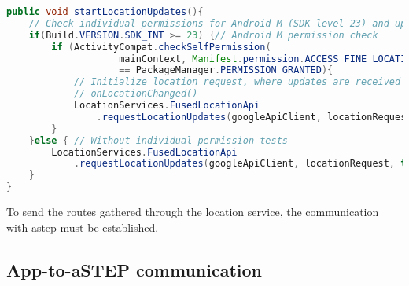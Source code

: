 \begin{lstlisting}[language=Java, label=startLocationUpdates, caption=Start location updates functions.]
public void startLocationUpdates(){
	// Check individual permissions for Android M (SDK level 23) and up.
	if(Build.VERSION.SDK_INT >= 23) {// Android M permission check
		if (ActivityCompat.checkSelfPermission(
					mainContext, Manifest.permission.ACCESS_FINE_LOCATION)
					== PackageManager.PERMISSION_GRANTED){
			// Initialize location request, where updates are received by 
			// onLocationChanged()
			LocationServices.FusedLocationApi
				.requestLocationUpdates(googleApiClient, locationRequest, this);
		}
	}else { // Without individual permission tests
		LocationServices.FusedLocationApi
			.requestLocationUpdates(googleApiClient, locationRequest, this);
	}
}
\end{lstlisting}

To send the routes gathered through the location service, the communication with \gls{astep} must be established.

\subsection{App-to-aSTEP communication}
